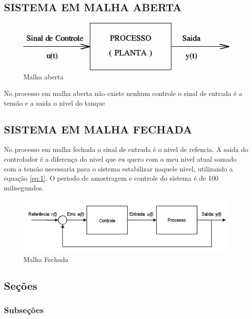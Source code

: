 \documentclass[a4paper,12pt]{article}
\begin{document}
\subsection{SISTEMA EM MALHA ABERTA}

\begin{figure}[H]
\includegraphics[width=15cm]{malhaAberta.png}
\caption{Malha aberta}
\label{fig:malhaAberta}
\end{figure}

No processo em malha aberta não existe nenhum controle o sinal de entrada é a tensão e a saida o nivel do tanque


\subsection{SISTEMA EM MALHA FECHADA}

No processo em malha fechada o sinal de entrada é o nivel de refencia.
A saida do controlador é a diferença do nivel que eu quero com o meu nivel atual somado com a tensão necessaria para o sistema estabilizar naquele nivel, utilizando a equação \ref{eq:1}.
O periodo de amostragem e controle do sistema é de 100 milisegundos.



\begin{figure}[H]
\includegraphics[width=15cm]{malhaFechada.jpg}
\caption{Malha Fechada}
\label{fig:malhaFechada}
\end{figure}



\subsection{Seções}

\subsubsection{Subseções}
\end{document}
